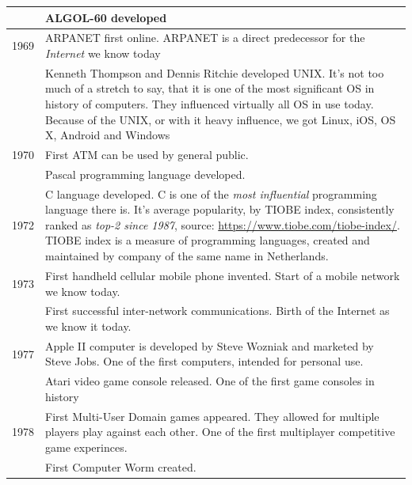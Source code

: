 \documentclass{report}
\begin{document}
\begin{longtable}{p{}p{}}
                \cmidrule(r){2-2}
                        & ALGOL-60 developed \\
                \midrule
                1969 & ARPANET first online. ARPANET is a direct predecessor for the \emph{Internet} we know today\\
                \cmidrule(r){2-2}
                        & Kenneth Thompson and Dennis Ritchie developed UNIX. It's not too much of a stretch to say, that it is one of the most significant OS in history
                        of computers. They influenced virtually all OS in use today. Because of the UNIX, or with it heavy influence, we got Linux, iOS, OS X, Android and Windows\\
                \midrule
                1970 & First ATM can be used by general public. \\
                \cmidrule(r){2-2}
                        & Pascal programming language developed. \\
                \midrule
                1972 & C language developed. C is one of the \emph{most influential} programming language there is. It's average popularity, by 
                TIOBE index, consistently ranked as \emph{top-2 since 1987}, source: \href{https://www.tiobe.com/tiobe-index/}{https://www.tiobe.com/tiobe-index/}.
                TIOBE index is a measure of programming languages, created and maintained by company of the same name in Netherlands. \\
                \midrule
                1973 & First handheld cellular mobile phone invented. Start of a mobile network we know today. \\
                \cmidrule(r){2-2}
                     & First successful inter-network communications. Birth of the Internet as we know it today. \\ 
                \midrule
                1977 & Apple II computer is developed by Steve Wozniak and marketed by Steve Jobs. One of the first computers, intended for personal use. \\
                \cmidrule(r){2-2}
                     & Atari video game console released. One of the first game consoles in history\\
                \midrule
                1978 & First Multi-User Domain games appeared. They allowed for multiple players play against each other. One of the first multiplayer competitive game experinces.\\
                \cmidrule(r){2-2}
                     & First Computer Worm created.\\

\end{longtable}
\end{document}
